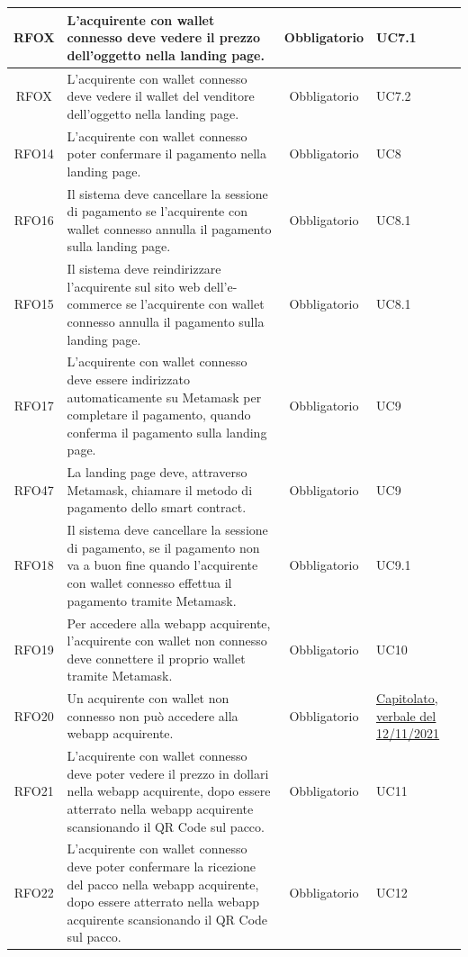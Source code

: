 \documentclass[a4paper, 12pt]{article}
\begin{document}
\begin{longtable}{|c|p{7cm}|c|p{4cm}|}
\hline
RFOX & L'acquirente con wallet connesso deve vedere il prezzo dell'oggetto nella landing page. & Obbligatorio & UC7.1 \\
\hline
RFOX & L'acquirente con wallet connesso deve vedere il wallet del venditore dell'oggetto nella landing page. & Obbligatorio & UC7.2 \\
\hline
RFO14 & L'acquirente con wallet connesso poter confermare il pagamento nella landing page. & Obbligatorio & UC8 \\
\hline
RFO16 & Il sistema deve cancellare la sessione di pagamento se l'acquirente con wallet connesso annulla il pagamento sulla landing page. & Obbligatorio & UC8.1 \\
\hline
RFO15 & Il sistema deve reindirizzare l'acquirente sul sito web dell'e-commerce se l'acquirente con wallet connesso annulla il pagamento sulla landing page. & Obbligatorio & UC8.1 \\
\hline
RFO17 & L'acquirente con wallet connesso deve essere indirizzato automaticamente su Metamask per completare il pagamento, quando conferma il pagamento sulla landing page. & Obbligatorio & UC9 \\
\hline
RFO47 & La landing page deve, attraverso Metamask, chiamare il metodo di pagamento dello smart contract. & Obbligatorio & UC9 \\
\hline
RFO18 & Il sistema deve cancellare la sessione di pagamento, se il pagamento non va a buon fine quando l'acquirente con wallet connesso effettua il pagamento tramite Metamask. & Obbligatorio & UC9.1 \\
\hline
RFO19 & Per accedere alla webapp acquirente, l'acquirente con wallet non connesso deve connettere il proprio wallet tramite Metamask. & Obbligatorio & UC10 \\
\hline
RFO20 & Un acquirente con wallet non connesso non può accedere alla webapp acquirente. & Obbligatorio & \underline{\href{https://www.math.unipd.it/~tullio/IS-1/2021/Progetto/C2.pdf}{Capitolato}}, \underline{\href{https://github.com/iota97/WinningSoftwareSolution/blob/main/public/interni/verbali/2021_11_12_I.pdf}{verbale del 12/11/2021}} \\
\hline
RFO21 & L'acquirente con wallet connesso deve poter vedere il prezzo in dollari nella webapp acquirente, dopo essere atterrato nella webapp acquirente scansionando il QR Code sul pacco. & Obbligatorio & UC11 \\
\hline
RFO22 & L'acquirente con wallet connesso deve poter confermare la ricezione del pacco nella webapp acquirente, dopo essere atterrato nella webapp acquirente scansionando il QR Code sul pacco. & Obbligatorio & UC12 \\

\end{longtable}
\end{document}
